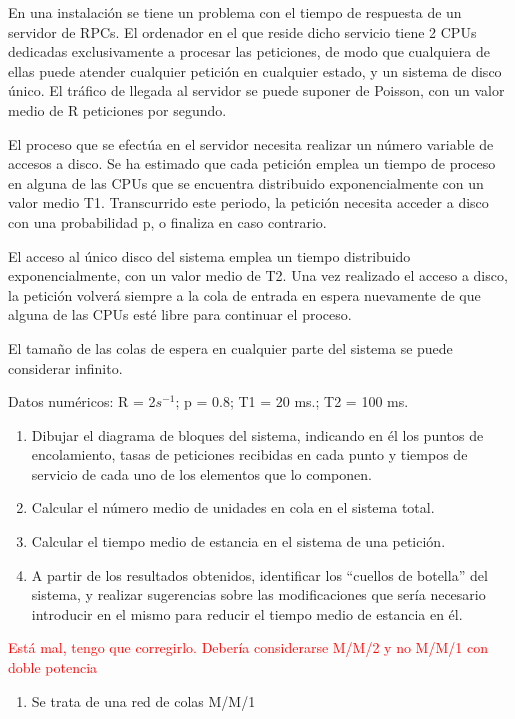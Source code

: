 \begin{problem}[17]
En una instalación se tiene un problema con el tiempo de respuesta de un servidor de RPCs. El ordenador en el que reside dicho servicio tiene 2 CPUs dedicadas exclusivamente a procesar las peticiones, de modo que cualquiera de ellas puede atender cualquier petición en cualquier estado, y un sistema de disco único. El tráfico de llegada al servidor se puede suponer de Poisson, con un valor medio de R peticiones por segundo.

El proceso que se efectúa en el servidor necesita realizar un número variable de accesos a disco. Se ha estimado que cada petición emplea un tiempo de proceso en alguna de las CPUs que se encuentra distribuido exponencialmente con un valor medio T1. Transcurrido este periodo, la petición necesita acceder a disco con una probabilidad p, o finaliza en caso contrario.

El acceso al único disco del sistema emplea un tiempo distribuido exponencialmente, con un valor medio de T2.
Una vez realizado el acceso a disco, la petición volverá siempre a la cola de entrada en espera nuevamente de que alguna de las CPUs esté libre para continuar el proceso.

El tamaño de las colas de espera en cualquier parte del sistema se puede considerar infinito.

Datos numéricos: R = 2$s^{-1}$; p = 0.8; T1 = 20 ms.; T2 = 100 ms.
\begin{enumerate}
\item Dibujar el diagrama de bloques del sistema, indicando en él los puntos de encolamiento, tasas de peticiones recibidas en cada punto y tiempos de servicio de cada uno de los elementos que lo componen.
\item Calcular el número medio de unidades en cola en el sistema total.
\item Calcular el tiempo medio de estancia en el sistema de una petición.
\item A partir de los resultados obtenidos, identificar los ``cuellos de botella'' del sistema, y realizar sugerencias sobre las modificaciones que sería necesario introducir en el mismo para reducir el tiempo medio de estancia en él.
\end{enumerate}
\solution

\yoP


\textcolor{red}{Está mal, tengo que corregirlo. Debería considerarse M/M/2 y no M/M/1 con doble potencia}

\begin{enumerate}
\item Se trata de una red de colas M/M/1


\end{enumerate}
\end{problem}
